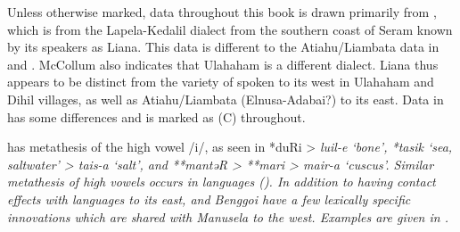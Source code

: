 Unless otherwise marked,  data throughout this book is drawn
primarily from \citet{McCollum-Grimes1990},
which is from the Lapela-Kedalil dialect from the southern coast
of Seram known by its speakers as Liana.
This data is different to the Atiahu/Liambata data in \citet{Wallace1869}
and  \citet{Stresemann1927}.
McCollum also indicates that Ulahaham is a different dialect.
Liana thus appears to be distinct from the variety of 
spoken to its west in Ulahaham
and Dihil villages, as well as Atiahu/Liambata (Elnusa-Adabai?) to its east.
Data in \citet{Collins1986} has some differences
and is marked as (C) throughout.

 has metathesis of the high vowel /i/,
as seen in *duRi > \it{luil-e} ‘bone’,
*tasik ‘sea, saltwater’ > \it{tais-a} ‘salt’,
and **mantəR > **mari > \it{mair-a} ‘cuscus’.
Similar metathesis of high vowels occurs in  languages ().
In addition to having contact effects with  languages
to its east,  and Benggoi have a few lexically specific innovations
which are shared with Manusela to the west.
Examples are given in .


